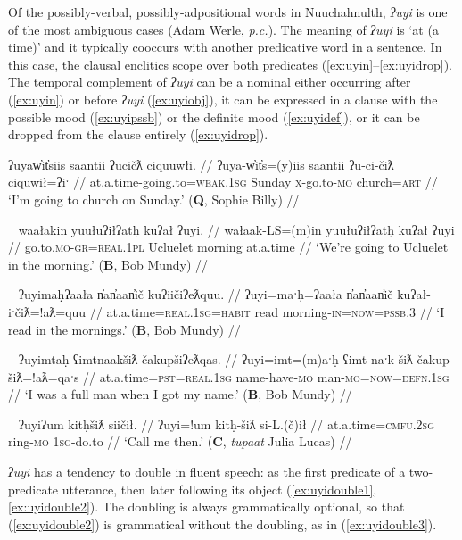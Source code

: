 Of the possibly-verbal, possibly-adpositional words in Nuuchahnulth, \textit{ʔuyi} is one of the most ambiguous cases (Adam Werle, \textit{p.c.}). The meaning of \textit{ʔuyi} is `at (a time)' and it typically cooccurs with another predicative word in a sentence. In this case, the clausal enclitics scope over both predicates (\ref{ex:uyin}--\ref{ex:uyidrop}). The temporal complement of \textit{ʔuyi} can be a nominal either occurring after (\ref{ex:uyin}) or before \textit{ʔuyi} (\ref{ex:uyiobj}), it can be expressed in a clause with the possible mood (\ref{ex:uyipssb}) or the definite mood (\ref{ex:uyidef}), or it can be dropped from the clause entirely (\ref{ex:uyidrop}).

\ex \label{ex:uyin}
\begingl
\glpreamble ʔuyaw̓it̓siis saantii ʔucičƛ ciquuwłi. //
\gla ʔuya-w̓it̓s=(y)iis saantii ʔu-ci-čiƛ ciquwił=ʔiˑ //
\glb at.a.time-going.to=\textsc{weak.1sg} Sunday \textsc{x}-go.to-\textsc{mo} church=\textsc{art} //
\glft `I'm going to church on Sunday.' (\textbf{Q}, Sophie Billy) //
\endgl
\xe

\ex~ \label{ex:uyiobj}
\begingl
\glpreamble waałakin yuułuʔiłʔatḥ kuʔał ʔuyi. //
\gla wałaak-LS=(m)in yuułuʔiłʔatḥ kuʔał ʔuyi //
\glb go.to.\textsc{mo}-\textsc{gr}=\textsc{real.1pl} Ucluelet morning at.a.time //
\glft `We're going to Ucluelet in the morning.' (\textbf{B}, Bob Mundy) //
\endgl
\xe

\ex~ \label{ex:uyipssb}
\begingl
\glpreamble ʔuyimaḥʔaała n̓an̓aan̓ič kuʔiičiʔeƛquu. //
\gla ʔuyi=maˑḥ=ʔaała n̓an̓aan̓ič kuʔał-iˑčiƛ=!aƛ=quu //
\glb at.a.time=\textsc{real.1sg}=\textsc{habit} read morning-\textsc{in}=\textsc{now}=\textsc{pssb.3} //
\glft `I read in the mornings.' (\textbf{B}, Bob Mundy) //
\endgl
\xe

\ex~ \label{ex:uyidef}
\begingl
\glpreamble ʔuyimtaḥ ʕimtnaakšiƛ čakupšiʔeƛqas. //
\gla ʔuyi=imt=(m)aˑḥ ʕimt-naˑk-šiƛ čakup-šiƛ=!aƛ=qaˑs //
\glb at.a.time=\textsc{pst}=\textsc{real.1sg} name-have-\textsc{mo} man-\textsc{mo}=\textsc{now}=\textsc{defn.1sg} //
\glft `I was a full man when I got my name.' (\textbf{B}, Bob Mundy) //
\endgl
\xe

\ex~ \label{ex:uyidrop}
\begingl
\glpreamble ʔuyiʔum kitḥšiƛ siičił. //
\gla ʔuyi=!um kitḥ-šiƛ si-L.(č)ił //
\glb at.a.time=\textsc{cmfu.2sg} ring-\textsc{mo} \textsc{1sg}-do.to //
\glft `Call me then.' (\textbf{C}, \textit{tupaat} Julia Lucas) //
\endgl
\xe

\textit{ʔuyi} has a tendency to double in fluent speech: as the first predicate of a two-predicate utterance, then later following its object (\ref{ex:uyidouble1}, \ref{ex:uyidouble2}). The doubling is always grammatically optional, so that (\ref{ex:uyidouble2}) is grammatical without the doubling, as in (\ref{ex:uyidouble3}).

